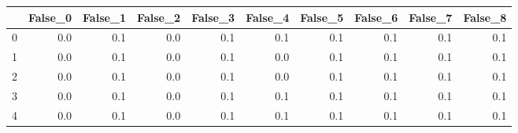 \begin{tabular}{lrrrrrrrrr}
\toprule
{} &  False\_0 &  False\_1 &  False\_2 &  False\_3 &  False\_4 &  False\_5 &  False\_6 &  False\_7 &  False\_8 \\ \hline
\midrule
0 &      0.0 &      0.1 &      0.0 &      0.1 &      0.1 &      0.1 &      0.1 &      0.1 &      0.1 \\ \hline
1 &      0.0 &      0.1 &      0.0 &      0.1 &      0.0 &      0.1 &      0.1 &      0.1 &      0.1 \\ \hline
2 &      0.0 &      0.1 &      0.0 &      0.1 &      0.0 &      0.1 &      0.1 &      0.1 &      0.1 \\ \hline
3 &      0.0 &      0.1 &      0.0 &      0.1 &      0.1 &      0.1 &      0.1 &      0.1 &      0.1 \\ \hline
4 &      0.0 &      0.1 &      0.0 &      0.1 &      0.1 &      0.1 &      0.1 &      0.1 &      0.1 \\ \hline
\bottomrule
\end{tabular}

